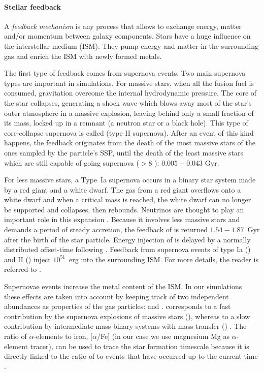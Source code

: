 \paragraph{Stellar feedback}
A \emph{feedback mechanism} is any process that allows to exchange energy, matter and/or momentum between galaxy components. Stars have a huge influence on the interstellar medium (ISM). They pump energy and matter in the surrounding gas and enrich the ISM with newly formed metals.

The first type of feedback comes from supernova events. Two main supernova types are important in simulations. For massive stars, when all the fusion fuel is consumed, gravitation overcome the internal hydrodynamic pressure. The core of the star collapses, generating a shock wave which blows away most of the star's outer atmosphere in a massive explosion, leaving behind only a small fraction of its mass, locked up in a remnant (a neutron star or a black hole). This type of core-collapse supernova is called \snii{} (type II supernova).
After an event of this kind happens, the feedback originates from the death of the most massive stars of the ones sampled by the particle's SSP, until the death of the least massive stars which are still capable of going supernova ($>8$ \Msun ): $0.005 - 0.043$ Gyr.

For less massive stars, a Type~Ia supernova occurs in a binary star system made by a red giant and a white dwarf.
The gas from a red giant overflows onto a white dwarf and when a critical mass is reached, the white dwarf can no longer be supported and collapses, then rebounds. Neutrinos are thought to play an important role in this expansion \citep{Wongwathanarat2017}.
Because it involves less massive stars and demands a period of steady accretion, the feedback of \snia{} is returned $1.54 − 1.87$~Gyr after the birth of the star particle.
Energy injection of \snia{} is delayed by a normally distributed offset-time following \citet{Strolger2004}.
Feedback from supernova events of type Ia (\snia) and II (\snii) inject $10^{51}$~erg into the surrounding ISM. For more details, the reader is referred to \cite{Valcke2008}.


Supernovae events increase the metal content of the ISM. %
In our simulations these effects are taken into account by keeping track of two independent abundances as properties of the gas particles: \mgfe{} and \feh{}.
\mgfe{} corresponds to a fast contribution by the supernova explosions of massive stars (\snii{}), whereas \feh{} to a slow contribution by  intermediate mass binary systems with mass transfer (\snia{}) \citep{DeRijcke2013}.
The ratio of $\alpha$-elements to iron, [$\alpha$/Fe] (in our case we use magnesium Mg as $\alpha$-element tracer), can be used to trace the star formation timescale because it is directly linked to the ratio of \snii{} to \snia{} events that have occurred up to the current time \citep{Tolstoy2009}.

